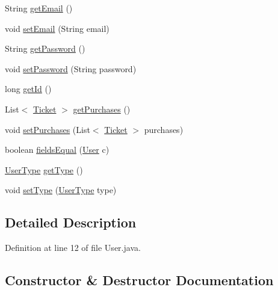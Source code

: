 \begin{DoxyCompactItemize}
\item 
String \mbox{\hyperlink{classes_1_1deusto_1_1server_1_1jdo_1_1_user_aa1ba6d9e3d0572b90dac6ff627ee3f95}{get\+Email}} ()
\item 
void \mbox{\hyperlink{classes_1_1deusto_1_1server_1_1jdo_1_1_user_affc32b9cc71d8e45cb695339b34a2abd}{set\+Email}} (String email)
\item 
String \mbox{\hyperlink{classes_1_1deusto_1_1server_1_1jdo_1_1_user_a1900ee126da22ed0f043e0077e8be049}{get\+Password}} ()
\item 
void \mbox{\hyperlink{classes_1_1deusto_1_1server_1_1jdo_1_1_user_a2e052b5a7cab949f61580edf44bbd233}{set\+Password}} (String password)
\item 
long \mbox{\hyperlink{classes_1_1deusto_1_1server_1_1jdo_1_1_user_ac116b1ec523da06c6776eaa76c910125}{get\+Id}} ()
\item 
List$<$ \mbox{\hyperlink{classes_1_1deusto_1_1server_1_1jdo_1_1_ticket}{Ticket}} $>$ \mbox{\hyperlink{classes_1_1deusto_1_1server_1_1jdo_1_1_user_a320e5da31fb294ff638ff77b0c4f6de4}{get\+Purchases}} ()
\item 
void \mbox{\hyperlink{classes_1_1deusto_1_1server_1_1jdo_1_1_user_a37a375d73be22f96c8fdb5bb69239cfa}{set\+Purchases}} (List$<$ \mbox{\hyperlink{classes_1_1deusto_1_1server_1_1jdo_1_1_ticket}{Ticket}} $>$ purchases)
\item 
boolean \mbox{\hyperlink{classes_1_1deusto_1_1server_1_1jdo_1_1_user_a52fa0dedc394edca2c1d089ec632996b}{fields\+Equal}} (\mbox{\hyperlink{classes_1_1deusto_1_1server_1_1jdo_1_1_user}{User}} c)
\item 
\mbox{\hyperlink{enumes_1_1deusto_1_1server_1_1jdo_1_1_user_type}{User\+Type}} \mbox{\hyperlink{classes_1_1deusto_1_1server_1_1jdo_1_1_user_ac7a47d7d9f3b6212ea22d2fe6b0e8457}{get\+Type}} ()
\item 
void \mbox{\hyperlink{classes_1_1deusto_1_1server_1_1jdo_1_1_user_ac56a41d0180453b832c405cc0d94d170}{set\+Type}} (\mbox{\hyperlink{enumes_1_1deusto_1_1server_1_1jdo_1_1_user_type}{User\+Type}} type)
\end{DoxyCompactItemize}


\subsection{Detailed Description}


Definition at line 12 of file User.\+java.



\subsection{Constructor \& Destructor Documentation}
\mbox{\label{classes_1_1deusto_1_1server_1_1jdo_1_1_user_a3c1d7bfbedde3bad6bed8ccd3288072d}} 

